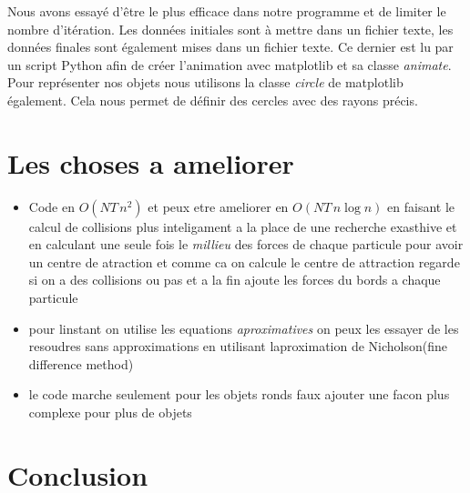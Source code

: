 \documentclass[a4paper, 11pt, oneside]{article} %
\begin{document}
    Nous avons essayé d'être le plus efficace dans notre programme et de limiter le nombre d'itération. Les données initiales sont à mettre dans un fichier texte, les données finales sont également mises dans un fichier texte. Ce dernier est lu par un script Python afin de créer l'animation avec matplotlib et sa classe \textit{animate}. Pour représenter nos objets nous utilisons la classe \textit{circle} de matplotlib également. Cela nous permet de définir des cercles avec des rayons précis.
    
\section{Les choses a ameliorer}
    \begin{itemize}
        \item Code en $O(NT\,n^2)$ et peux etre ameliorer en $O(NT\, n\log n)$ en faisant le calcul de collisions plus inteligament a la place de une recherche exasthive et en calculant une seule fois le \textit{millieu} des forces de chaque particule pour avoir un centre de atraction et comme ca on calcule le centre de attraction regarde si on a des collisions ou pas et a la fin ajoute les forces du bords a chaque particule
        \item pour linstant on utilise les equations \textit{aproximatives} on peux les essayer de les resoudres sans approximations en utilisant laproximation de Nicholson(fine difference method)
        \item le code marche seulement pour les objets ronds faux ajouter une facon plus complexe pour plus de objets
    \end{itemize}
\section*{Conclusion}

\newpage
\thispagestyle{empty}
\nocite{*}
\printbibliography[title = Bibliographie]
\end{document}
